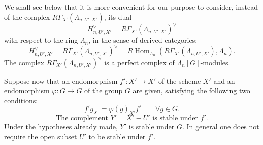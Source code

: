 \documentclass[11pt]{article}
\DeclareMathOperator{\Hom}{Hom}
\providecommand{\Hom}{\operatorname{Hom}}
\providecommand{\La}{\Lambda}
\providecommand{\Hom}{\operatorname{Hom}}
\begin{document}
We shall see below that it is more convenient for our purpose to consider, instead of the complex $R\Gamma_{X'}(\La_{n,U',X'})$, its dual
\[
H_{n,U',X'}^\vee=R\Gamma_{X'}(\La_{n,U',X'})^\vee
\]
with respect to the ring $\La_n$, in the sense of derived categories:
\[
H_{n,U',X'}^\vee
=R\Gamma_{X'}(\La_{n,U',X'})^\vee
=R\Hom_{\La_n}(R\Gamma_{X'}(\La_{n,U',X'}),\La_n).
\]
The complex $R\Gamma_{X'}(\La_{n,U',X'})^\vee$ is a perfect complex of $\La_n[G]$-modules.

Suppose now that an endomorphism $f':X'\to X'$ of the scheme $X'$ and an endomorphism $\varphi:G\to G$ of the group $G$ are given, satisfying the following two conditions:
\begin{equation}\tag{1.1}
f'g_{X'}=\varphi(g)_{X'}f'\qquad \forall g\in G .
\end{equation}
\begin{equation}\tag{1.2}
\text{The complement }Y'=X'-U'\text{ is stable under }f'.
\end{equation}
Under the hypotheses already made, $Y'$ is stable under $G$. In general one does not require the open subset $U'$ to be stable under $f'$.
\end{document}

